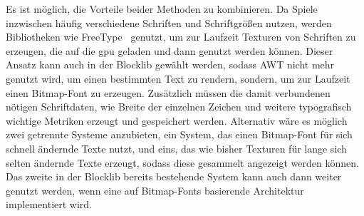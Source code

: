 Es ist möglich, die Vorteile beider Methoden zu kombinieren. Da Spiele inzwischen häufig verschiedene Schriften und Schriftgrößen nutzen, werden Bibliotheken wie FreeType~\cite{TheFreeTypeProject,Vries2020} genutzt, um zur Laufzeit Texturen von Schriften zu erzeugen, die auf die \ac{gpu} geladen und dann genutzt werden können. Dieser Ansatz kann auch in der Blocklib gewählt werden, sodass AWT nicht mehr genutzt wird, um einen bestimmten Text zu rendern, sondern, um zur Laufzeit einen Bitmap-Font zu erzeugen. Zusätzlich müssen die damit verbundenen nötigen Schriftdaten, wie Breite der einzelnen Zeichen und weitere typografisch wichtige Metriken erzeugt und gespeichert werden. Alternativ wäre es möglich zwei getrennte Systeme anzubieten, ein System, das einen Bitmap-Font für sich schnell ändernde Texte nutzt, und eins, das wie bisher Texturen für lange sich selten ändernde Texte erzeugt, sodass diese gesammelt angezeigt werden können. Das zweite in der Blocklib bereits bestehende System kann auch dann weiter genutzt werden, wenn eine auf Bitmap-Fonts basierende Architektur implementiert wird.
